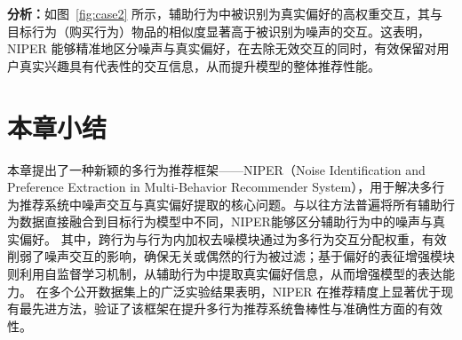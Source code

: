 \textbf{分析：}如图~\ref{fig:case2} 所示，辅助行为中被识别为真实偏好的高权重交互，其与目标行为（购买行为）物品的相似度显著高于被识别为噪声的交互。这表明，NIPER 能够精准地区分噪声与真实偏好，在去除无效交互的同时，有效保留对用户真实兴趣具有代表性的交互信息，从而提升模型的整体推荐性能。

\section{本章小结}
本章提出了一种新颖的多行为推荐框架——NIPER（Noise Identification and Preference Extraction in Multi-Behavior Recommender System），用于解决多行为推荐系统中噪声交互与真实偏好提取的核心问题。与以往方法普遍将所有辅助行为数据直接融合到目标行为模型中不同，NIPER能够区分辅助行为中的噪声与真实偏好。
其中，跨行为与行为内加权去噪模块通过为多行为交互分配权重，有效削弱了噪声交互的影响，确保无关或偶然的行为被过滤；基于偏好的表征增强模块则利用自监督学习机制，从辅助行为中提取真实偏好信息，从而增强模型的表达能力。
在多个公开数据集上的广泛实验结果表明，NIPER 在推荐精度上显著优于现有最先进方法，验证了该框架在提升多行为推荐系统鲁棒性与准确性方面的有效性。